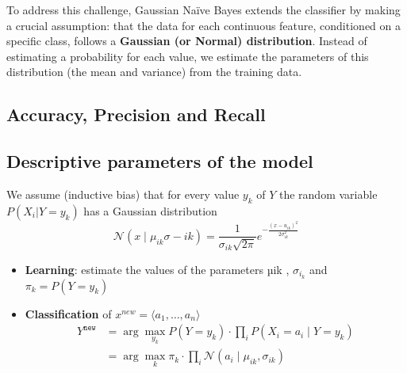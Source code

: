 To address this challenge, Gaussian Naïve Bayes extends the classifier by making a crucial assumption: that the data for each continuous feature, conditioned on a specific class, follows a \textbf{Gaussian (or Normal) distribution}. Instead of estimating a probability for each value, we estimate the parameters of this distribution (the mean and variance) from the training data.


\subsection{Accuracy, Precision and Recall}
\subsection{Descriptive parameters of the model}
We assume (inductive bias) that for every value $y_k$ of $Y$ the
random variable $P(X_i |Y = y_k )$ has a Gaussian distribution
\[
    \mathcal{N}(x\mid \mu_{ik} \sigma-{ik}) = \frac{1}{\sigma_{ik}\sqrt{2\pi}}e^{-\frac{(x-u_{ik})^2}{2\sigma^2_{ik}}}
\]
\begin{itemize}
    \item \textbf{Learning}: estimate the values of the parameters µik , $\sigma_{i_k}$ and $π_k = P(Y = y_k )$
    \item \textbf{Classification} of $x^{new} = \langle a_1,\dots, a_n\rangle$
    \[
        \begin{align*}
            Y^{\texttt{new}} &= \arg \max_{y_k} P(Y= y_k ) \cdot \prod_{i} P(X_i = a_i \mid Y = y_k )\\
            & = \arg \max_{k}\pi_k\cdot \prod_{i}\mathcal{N}(a_i\mid \mu_{ik},\sigma_{ik})
        \end{align*}
    \]
\end{itemize}

